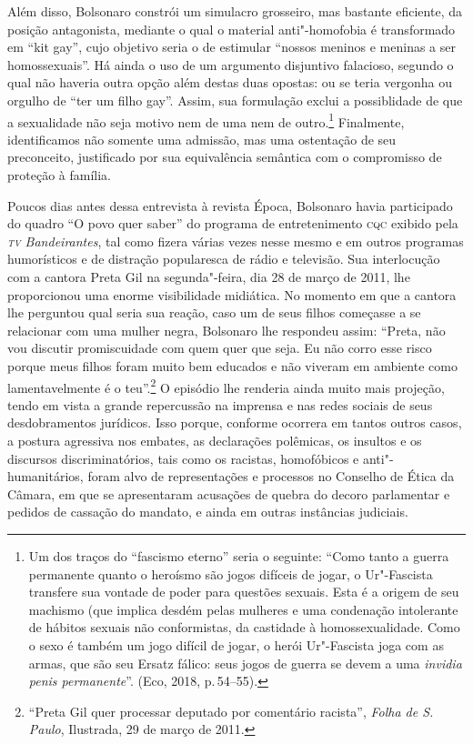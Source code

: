 Além disso, Bolsonaro constrói um simulacro grosseiro, mas bastante
eficiente, da posição antagonista, mediante o qual o material
anti"-homofobia é transformado em ``kit gay'', cujo objetivo seria o de
estimular ``nossos meninos e meninas a ser homossexuais''. Há ainda o
uso de um argumento disjuntivo falacioso, segundo o qual não haveria
outra opção além destas duas opostas: ou se teria vergonha ou orgulho de
``ter um filho gay''. Assim, sua formulação exclui a possiblidade de que
a sexualidade não seja motivo nem de uma nem de outro.\footnote{Um dos
  traços do ``fascismo eterno'' seria o seguinte: ``Como tanto a guerra
  permanente quanto o heroísmo são jogos difíceis de jogar, o
  Ur"-Fascista transfere sua vontade de poder para questões sexuais. Esta
  é a origem de seu machismo (que implica desdém pelas mulheres e uma
  condenação intolerante de hábitos sexuais não conformistas, da
  castidade à homossexualidade. Como o sexo é também um jogo difícil de
  jogar, o herói Ur"-Fascista joga com as armas, que são seu Ersatz
  fálico: seus jogos de guerra se devem a uma \emph{invidia penis
  permanente}''. (Eco, 2018, p.\,54--55).} Finalmente, identificamos não
somente uma admissão, mas uma ostentação de seu preconceito, justificado
por sua equivalência semântica com o compromisso de proteção à família.

Poucos dias antes dessa entrevista à revista Época, Bolsonaro havia
participado do quadro ``O povo quer saber'' do programa de
entretenimento \textsc{cqc} exibido pela \emph{\textsc{tv} Bandeirantes}, tal como
fizera várias vezes nesse mesmo e em outros programas humorísticos e de
distração popularesca de rádio e televisão. Sua interlocução com a
cantora Preta Gil na segunda"-feira, dia 28 de março de 2011, lhe
proporcionou uma enorme visibilidade midiática. No momento em que a
cantora lhe perguntou qual seria sua reação, caso um de seus filhos
começasse a se relacionar com uma mulher negra, Bolsonaro lhe respondeu
assim: ``Preta, não vou discutir promiscuidade com quem quer que seja.
Eu não corro esse risco porque meus filhos foram muito bem educados e
não viveram em ambiente como lamentavelmente é o teu''.\footnote{``Preta
  Gil quer processar deputado por comentário racista'', \textit{Folha de S.\,Paulo}, Ilustrada, 29 de março de 2011.}
O episódio lhe renderia ainda muito mais projeção, tendo em vista a
grande repercussão na imprensa e nas redes sociais de seus
desdobramentos jurídicos. Isso porque, conforme ocorrera em tantos
outros casos, a postura agressiva nos embates, as declarações polêmicas,
os insultos e os discursos discriminatórios, tais como os racistas,
homofóbicos e anti"-humanitários, foram alvo de representações e
processos no Conselho de Ética da Câmara, em que se apresentaram
acusações de quebra do decoro parlamentar e pedidos de cassação do
mandato, e ainda em outras instâncias judiciais.

